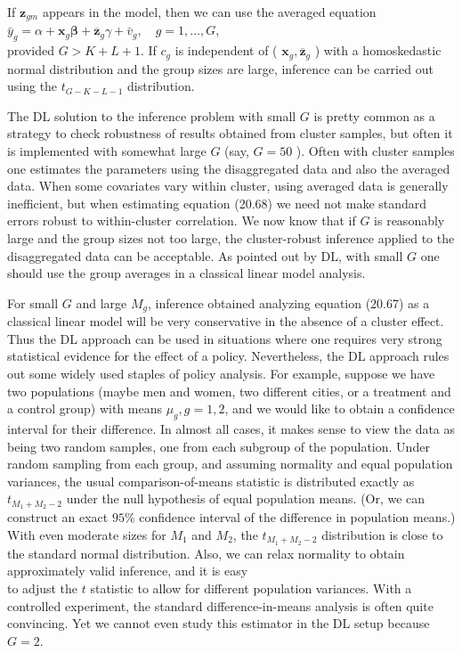 \documentclass[10pt]{article}
\begin{document}
If $\mathbf{z}_{g m}$ appears in the model, then we can use the averaged equation\\
$\bar{y}_{g}=\alpha+\mathbf{x}_{g} \boldsymbol{\beta}+\overline{\mathbf{z}}_{g} \gamma+\bar{v}_{g}, \quad g=1, \ldots, G$,\\
provided $G>K+L+1$. If $c_{g}$ is independent of ( $\mathbf{x}_{g}, \overline{\mathbf{z}}_{g}$ ) with a homoskedastic normal distribution and the group sizes are large, inference can be carried out using the $t_{G-K-L-1}$ distribution.

The DL solution to the inference problem with small $G$ is pretty common as a strategy to check robustness of results obtained from cluster samples, but often it is implemented with somewhat large $G$ (say, $G=50$ ). Often with cluster samples one estimates the parameters using the disaggregated data and also the averaged data. When some covariates vary within cluster, using averaged data is generally inefficient, but when estimating equation (20.68) we need not make standard errors robust to within-cluster correlation. We now know that if $G$ is reasonably large and the group sizes not too large, the cluster-robust inference applied to the disaggregated data can be acceptable. As pointed out by DL, with small $G$ one should use the group averages in a classical linear model analysis.

For small $G$ and large $M_{g}$, inference obtained analyzing equation (20.67) as a classical linear model will be very conservative in the absence of a cluster effect. Thus the DL approach can be used in situations where one requires very strong statistical evidence for the effect of a policy. Nevertheless, the DL approach rules out some widely used staples of policy analysis. For example, suppose we have two populations (maybe men and women, two different cities, or a treatment and a control group) with means $\mu_{g}, g=1,2$, and we would like to obtain a confidence interval for their difference. In almost all cases, it makes sense to view the data as being two random samples, one from each subgroup of the population. Under random sampling from each group, and assuming normality and equal population variances, the usual comparison-of-means statistic is distributed exactly as $t_{M_{1}+M_{2}-2}$ under the null hypothesis of equal population means. (Or, we can construct an exact $95 \%$ confidence interval of the difference in population means.) With even moderate sizes for $M_{1}$ and $M_{2}$, the $t_{M_{1}+M_{2}-2}$ distribution is close to the standard normal distribution. Also, we can relax normality to obtain approximately valid inference, and it is easy\\
to adjust the $t$ statistic to allow for different population variances. With a controlled experiment, the standard difference-in-means analysis is often quite convincing. Yet we cannot even study this estimator in the DL setup because $G=2$.
\end{document}
